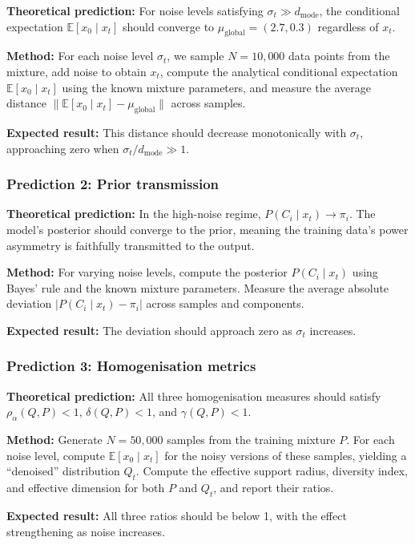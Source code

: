 \documentclass[11pt]{article}
\begin{document}
\textbf{Theoretical prediction:} For noise levels satisfying $\sigma_t \gg d_{\mathrm{mode}}$, the conditional expectation $\mathbb{E}[x_0 \mid x_t]$ should converge to $\mu_{\mathrm{global}} = (2.7, 0.3)$ regardless of $x_t$.

\textbf{Method:} For each noise level $\sigma_t$, we sample $N = 10{,}000$ data points from the mixture, add noise to obtain $x_t$, compute the analytical conditional expectation $\mathbb{E}[x_0 \mid x_t]$ using the known mixture parameters, and measure the average distance $\|\mathbb{E}[x_0 \mid x_t] - \mu_{\mathrm{global}}\|$ across samples.

\textbf{Expected result:} This distance should decrease monotonically with $\sigma_t$, approaching zero when $\sigma_t / d_{\mathrm{mode}} \gg 1$.

\subsubsection{Prediction 2: Prior transmission}

\textbf{Theoretical prediction:} In the high-noise regime, $P(C_i \mid x_t) \to \pi_i$. The model's posterior should converge to the prior, meaning the training data's power asymmetry is faithfully transmitted to the output.

\textbf{Method:} For varying noise levels, compute the posterior $P(C_i \mid x_t)$ using Bayes' rule and the known mixture parameters. Measure the average absolute deviation $|P(C_i \mid x_t) - \pi_i|$ across samples and components.

\textbf{Expected result:} The deviation should approach zero as $\sigma_t$ increases.

\subsubsection{Prediction 3: Homogenisation metrics}

\textbf{Theoretical prediction:} All three homogenisation measures should satisfy $\rho_\alpha(Q, P) < 1$, $\delta(Q, P) < 1$, and $\gamma(Q, P) < 1$.

\textbf{Method:} Generate $N = 50{,}000$ samples from the training mixture $P$. For each noise level, compute $\mathbb{E}[x_0 \mid x_t]$ for the noisy versions of these samples, yielding a ``denoised'' distribution $Q_t$. Compute the effective support radius, diversity index, and effective dimension for both $P$ and $Q_t$, and report their ratios.

\textbf{Expected result:} All three ratios should be below 1, with the effect strengthening as noise increases.
\end{document}
